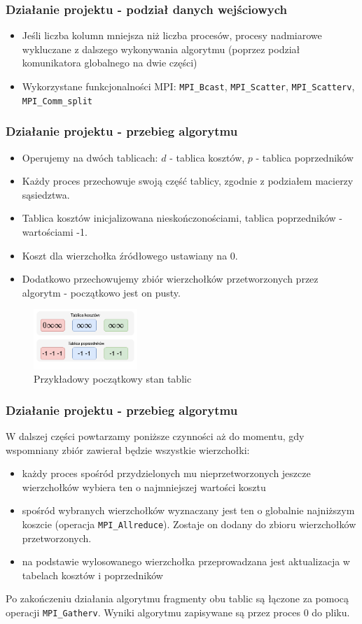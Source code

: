 \documentclass[10pt]{beamer}
\begin{document}
\begin{frame}
\frametitle{Działanie projektu - podział danych wejściowych}
\begin{itemize}
\item Jeśli liczba kolumn mniejsza niż liczba procesów, procesy nadmiarowe wykluczane z dalszego wykonywania algorytmu (poprzez podział komunikatora globalnego na dwie części)
\item Wykorzystane funkcjonalności MPI: \lstinline{MPI_Bcast}, \lstinline{MPI_Scatter}, \lstinline{MPI_Scatterv}, \lstinline{MPI_Comm_split}
\end{itemize}
\end{frame}

\begin{frame}
\frametitle{Działanie projektu - przebieg algorytmu}
\begin{itemize}
\item Operujemy na dwóch tablicach: $d$ - tablica kosztów, $p$ - tablica poprzedników
\item Każdy proces przechowuje swoją część tablicy, zgodnie z podziałem macierzy sąsiedztwa.
\item Tablica kosztów inicjalizowana nieskończonościami, tablica poprzedników - wartościami -1.
\item Koszt dla wierzchołka źródłowego ustawiany na 0.
\item Dodatkowo przechowujemy zbiór wierzchołków przetworzonych przez algorytm - początkowo jest on pusty.
\end{itemize}
\begin{figure}
\centering
\includegraphics[width=0.35\textwidth]{static/Arrays.pdf}
\caption{Przykładowy początkowy stan tablic}
\end{figure}
\end{frame}

\begin{frame}
\frametitle{Działanie projektu - przebieg algorytmu}
W dalszej części powtarzamy poniższe czynności aż do momentu, gdy wspomniany zbiór zawierał będzie wszystkie wierzchołki:
\begin{itemize}
\item każdy proces spośród przydzielonych mu nieprzetworzonych jeszcze wierzchołków wybiera ten o najmniejszej wartości kosztu
\item spośród wybranych wierzchołków wyznaczany jest ten o globalnie najniższym koszcie (operacja \lstinline{MPI_Allreduce}). Zostaje on dodany do zbioru wierzchołków przetworzonych.
\item na podstawie wylosowanego wierzchołka przeprowadzana jest aktualizacja w tabelach kosztów i poprzedników
\end{itemize}
Po zakończeniu działania algorytmu fragmenty obu tablic są łączone za pomocą operacji \lstinline{MPI_Gatherv}. Wyniki algorytmu zapisywane są przez proces 0 do pliku.
\end{frame}
\end{document}
